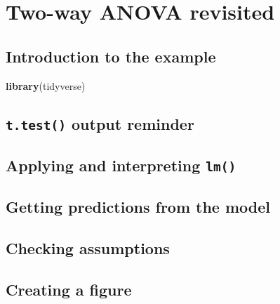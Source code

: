 \documentclass[
]{book}
\newenvironment{Shaded}{\begin{snugshade}}{\end{snugshade}}
\newcommand{\KeywordTok}[1]{\textcolor[rgb]{0.13,0.29,0.53}{\textbf{#1}}}
\newcommand{\NormalTok}[1]{#1}
\begin{document}
\hypertarget{two-way-anova-revisit}{%
\chapter{Two-way ANOVA revisited}\label{two-way-anova-revisit}}

\hypertarget{introduction-to-the-example-3}{%
\section{Introduction to the example}\label{introduction-to-the-example-3}}

\begin{Shaded}
\begin{Highlighting}[]
\KeywordTok{library}\NormalTok{(tidyverse)}
\end{Highlighting}
\end{Shaded}

\hypertarget{t.test-output-reminder-1}{%
\section{\texorpdfstring{\texttt{t.test()} output reminder}{t.test() output reminder}}\label{t.test-output-reminder-1}}

\hypertarget{applying-and-interpreting-lm-3}{%
\section{\texorpdfstring{Applying and interpreting \texttt{lm()}}{Applying and interpreting lm()}}\label{applying-and-interpreting-lm-3}}

\hypertarget{getting-predictions-from-the-model-3}{%
\section{Getting predictions from the model}\label{getting-predictions-from-the-model-3}}

\hypertarget{checking-assumptions-3}{%
\section{Checking assumptions}\label{checking-assumptions-3}}

\hypertarget{creating-a-figure-3}{%
\section{Creating a figure}\label{creating-a-figure-3}}
\end{document}
